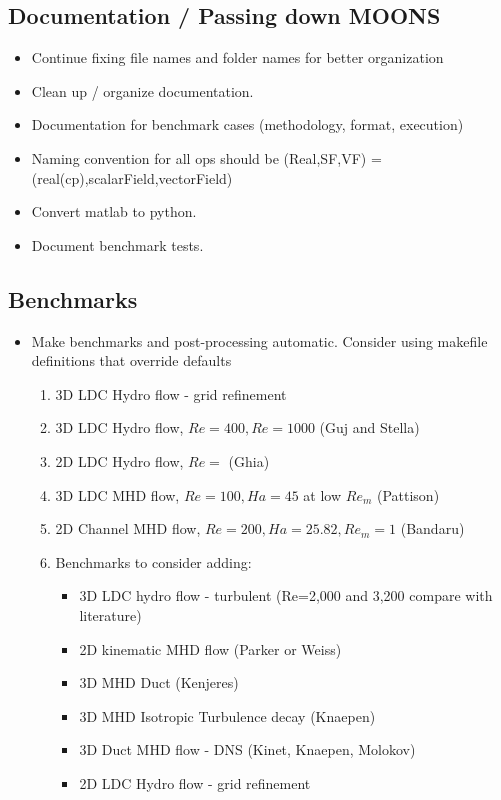 \documentclass[11pt]{article}
\begin{document}
\subsection{Documentation / Passing down MOONS}
\begin{itemize}
\setlength\itemsep{-1em}
\item Continue fixing file names and folder names for better organization
\item Clean up / organize documentation.
\item Documentation for benchmark cases (methodology, format, execution)
\item Naming convention for all ops should be (Real,SF,VF) = (real(cp),scalarField,vectorField)
\item Convert matlab to python.
\item Document benchmark tests.
\end{itemize}

\subsection{Benchmarks}

\begin{itemize}
\setlength\itemsep{-1em}
\item Make benchmarks and post-processing automatic. Consider using makefile definitions that override defaults
\begin{enumerate}
\setlength\itemsep{-1em}
\item 3D LDC Hydro flow - grid refinement
\item 3D LDC Hydro flow, $Re = 400, Re = 1000$ (Guj and Stella)
\item 2D LDC Hydro flow, $Re = $ (Ghia)
\item 3D LDC MHD flow, $Re = 100, Ha = 45$ at low $Re_m$ (Pattison)
\item 2D Channel MHD flow, $Re = 200, Ha = 25.82, Re_m = 1$ (Bandaru)
\item Benchmarks to consider adding:
\begin{itemize}
\setlength\itemsep{-1em}
\item 3D LDC hydro flow - turbulent (Re=2,000 and 3,200 compare with literature)
\item 2D kinematic MHD flow (Parker or Weiss)
\item 3D MHD Duct (Kenjeres)
\item 3D MHD Isotropic Turbulence decay (Knaepen)
\item 3D Duct MHD flow - DNS (Kinet, Knaepen, Molokov)
\item 2D LDC Hydro flow - grid refinement
\end{itemize}
\end{enumerate}
\end{itemize}
\end{document}
